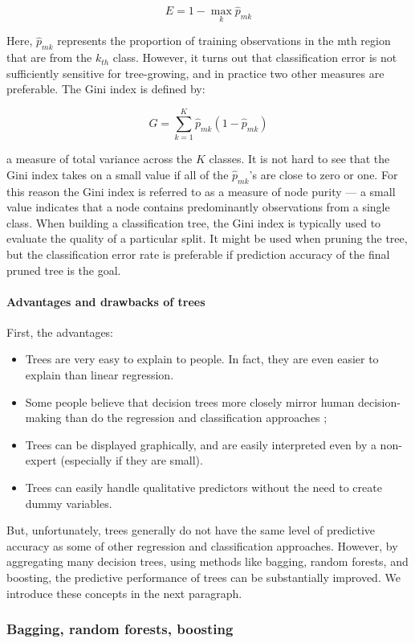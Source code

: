 $$E = 1 - \max_k{\hat{p}_{mk}}$$

Here, $\hat{p}_{mk}$ represents the proportion of training observations in the mth region that are
from the $k_{th}$ class. However, it turns out that classification error is not sufficiently
sensitive for tree-growing, and in practice two other measures are preferable. The Gini index is
defined by:

$$G = \sum_{k=1}^{K} \hat{p}_{mk}(1-\hat{p}_{mk})$$

a measure of total variance across the $K$ classes. It is not hard to see that the Gini index takes
on a small value if all of the $\hat{p}_{mk}$’s are close to zero or one. For this reason the Gini
index is referred to as a measure of node purity --- a small value indicates that a node contains
predominantly observations from a single class. When building a classification tree, the Gini index
is typically used to evaluate the quality of a particular split. It might be used when pruning the
tree, but the classification error rate is preferable if prediction accuracy of the final pruned
tree is the goal.

\paragraph{Advantages and drawbacks of trees}
First, the advantages:
\begin{itemize}
    \item Trees are very easy to explain to people. In fact, they are even easier to explain than
linear regression.
    \item Some people believe that decision trees more closely mirror human decision-making than do
the regression and classification approaches ;
    \item Trees can be displayed graphically, and are easily interpreted even by a non-expert
(especially if they are small).
    \item Trees can easily handle qualitative predictors without the need to create dummy variables.
\end{itemize}

But, unfortunately, trees generally do not have the same level of predictive accuracy as some of
other regression and classification approaches. However, by aggregating many decision trees, using
methods like bagging, random forests, and boosting, the predictive performance of trees can be
substantially improved. We introduce these concepts in the next paragraph.

\subsubsection{Bagging, random forests, boosting}

